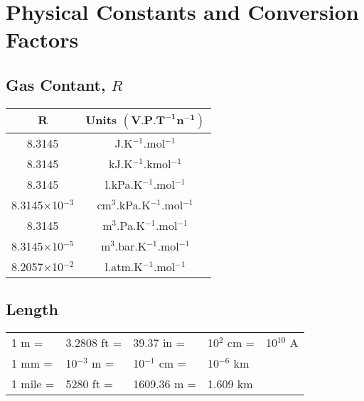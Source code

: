 
\chapter{Physical Constants and Conversion Factors}\label{Chapter:UnitConversion}

\section{Gas Contant, $R$}\label{Chapter:UnitConversion:Section:GasConstant}
     \begin{center}
     \begin{tabular}{|c c|}
       \hline
           $\mathbf{R}$   & {\bf Units} $\mathbf{\left(\text{V.P.T}^{-1}\text{n}^{-1}\right)}$ \\
           \hline\hline
           8.3145    &  J.K$^{-1}$.mol$^{-1}$  \\
           8.3145    &  kJ.K$^{-1}$.kmol$^{-1}$  \\
           8.3145    &  l.kPa.K$^{-1}$.mol$^{-1}$  \\
           8.3145$\times$10$^{-3}$    & cm$^{3}$.kPa.K$^{-1}$.mol$^{-1}$  \\
           8.3145    &  m$^{3}$.Pa.K$^{-1}$.mol$^{-1}$  \\
           8.3145$\times$10$^{-5}$    &  m$^{3}$.bar.K$^{-1}$.mol$^{-1}$  \\
           8.2057$\times$10$^{-2}$ &  l.atm.K$^{-1}$.mol$^{-1}$  \\
           \hline         
     \end{tabular}
     \end{center}
     
\section{Length}\label{Chapter:UnitConversion:Section:Length}
     \begin{center}
     \begin{tabular}{|l l l l l|}
       \hline
       1 m =& 3.2808 ft =& 39.37 in =& 10$^{2}$ cm =& 10$^{10}$ A \\
       1 mm =& 10$^{-3}$ m =& 10$^{-1}$ cm =& 10$^{-6}$ km &       \\
       1 mile =& 5280 ft =& 1609.36 m =& 1.609 km &             \\
       \hline           
     \end{tabular}
     \end{center}
          
